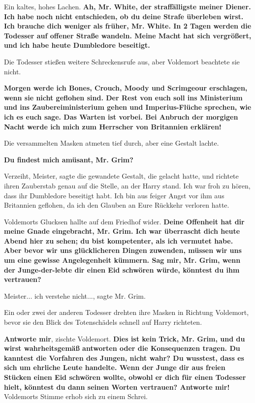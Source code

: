 Ein kaltes, hohes Lachen. \glqq{}\textbf{Ah, Mr. White, der straffälligste meiner
Diener. Ich habe noch nicht entschieden, ob du deine Strafe überleben wirst. Ich
brauche dich weniger als früher, Mr. White. In 2 Tagen werden die Todesser auf
offener Straße wandeln. Meine Macht hat sich vergrößert, und ich habe heute
Dumbledore beseitigt.}\grqq{}

Die Todesser stießen weitere Schreckensrufe aus, aber Voldemort beachtete sie
nicht.

\glqq{}\textbf{Morgen werde ich Bones, Crouch, Moody und Scrimgeour erschlagen,
wenn sie nicht geflohen sind. Der Rest von euch soll ins Ministerium und ins
Zaubereiministerium gehen und Imperius-Flüche sprechen, wie ich es euch sage.
Das Warten ist vorbei. Bei Anbruch der morgigen Nacht werde ich mich zum
Herrscher von Britannien erklären!}\grqq{}

Die versammelten Masken atmeten tief durch, aber eine Gestalt lachte.

\glqq{}\textbf{Du findest mich amüsant, Mr. Grim?}\grqq{}

\glqq{}Verzeiht, Meister\grqq{}, sagte die gewandete Gestalt, die gelacht hatte,
und richtete ihren Zauberstab genau auf die Stelle, an der Harry stand. \glqq{}
Ich war froh zu hören, dass ihr Dumbledore beseitigt habt. Ich bin aus feiger
Angst vor ihm aus Britannien geflohen, da ich den Glauben an Eure Rückkehr
verloren hatte.\grqq{}

Voldemorts Glucksen hallte auf dem Friedhof wider. \glqq{}\textbf{Deine Offenheit
hat dir meine Gnade eingebracht, Mr. Grim. Ich war überrascht dich heute Abend
hier zu sehen; du bist kompetenter, als ich vermutet habe. Aber bevor wir uns
glücklicheren Dingen zuwenden, müssen wir uns um eine gewisse Angelegenheit
kümmern. Sag mir, Mr. Grim, wenn der Junge-der-lebte dir einen Eid schwören
würde, könntest du ihm vertrauen?}\grqq{}

\glqq{}Meister... ich verstehe nicht...\grqq{}, sagte Mr. Grim.

Ein oder zwei der anderen Todesser drehten ihre Masken in Richtung Voldemort,
bevor sie den Blick des Totenschädels schnell auf Harry richteten.

\glqq{}\textbf{Antworte mir}\grqq{}, zischte Voldemort. \glqq{}\textbf{Dies ist
kein Trick, Mr. Grim, und du wirst wahrheitsgemäß antworten oder die
Konsequenzen tragen. Du kanntest die Vorfahren des Jungen, nicht wahr? Du
wusstest, dass es sich um ehrliche Leute handelte. Wenn der Junge dir aus freien
Stücken einen Eid schwören wollte, obwohl er dich für einen Todesser hielt,
könntest du dann seinen Worten vertrauen? Antworte mir!}\grqq{} Voldemorts Stimme
erhob sich zu einem Schrei.

